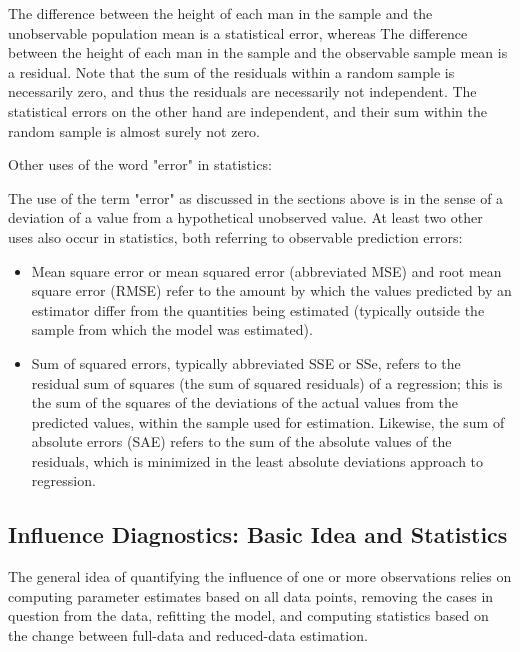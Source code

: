 \documentclass[Main.tex]{subfiles}
\begin{document}
The difference between the height of each man in the sample and the unobservable population mean is a statistical error, whereas
The difference between the height of each man in the sample and the observable sample mean is a residual.
Note that the sum of the residuals within a random sample is necessarily zero, and thus the residuals are necessarily not independent. The statistical errors on the other hand are independent, and their sum within the random sample is almost surely not zero.


Other uses of the word "error" in statistics: 

The use of the term "error" as discussed in the sections above is in the sense of a deviation of a value from a hypothetical unobserved value. At least two other uses also occur in statistics, both referring to observable prediction errors:

\begin{itemize}
	\item Mean square error or mean squared error (abbreviated MSE) and root mean square error (RMSE) refer to the amount by which the values predicted by an estimator differ from the quantities being estimated (typically outside the sample from which the model was estimated).
	
	\item 
	Sum of squared errors, typically abbreviated SSE or SSe, refers to the residual sum of squares (the sum of squared residuals) of a regression; this is the sum of the squares of the deviations of the actual values from the predicted values, within the sample used for estimation. Likewise, the sum of absolute errors (SAE) refers to the sum of the absolute values of the residuals, which is minimized in the least absolute deviations approach to regression.
	
\end{itemize}

\subsection{Influence Diagnostics: Basic Idea and Statistics} %


The general idea of quantifying the influence of one or more observations relies on computing parameter estimates based on all data points, removing the cases in question from the data, refitting the model, and computing statistics based on the change between full-data and reduced-data estimation.
\end{document}
